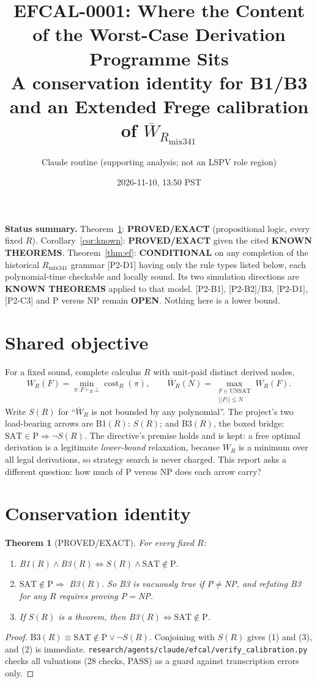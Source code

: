 \documentclass[11pt]{article}
\title{EFCAL-0001: Where the Content of the Worst-Case Derivation Programme Sits\\
\large A conservation identity for B1/B3 and an Extended Frege calibration of $\overline W_{R_{\mathrm{mix341}}}$}
\author{Claude routine (supporting analysis; not an LSPV role region)}
\date{2026-11-10, 13:50 PST}
\newtheorem{theorem}{Theorem}
\theoremstyle{remark}
\begin{document}
\maketitle

\noindent\textbf{Status summary.}
Theorem~\ref{thm:cons}: \textbf{PROVED/EXACT} (propositional logic, every fixed $R$).
Corollary~\ref{cor:known}: \textbf{PROVED/EXACT} given the cited \textbf{KNOWN THEOREMS}.
Theorem~\ref{thm:ef}: \textbf{CONDITIONAL} on any completion of the historical
$R_{\mathrm{mix341}}$ grammar [P2-D1] having only the rule types listed below,
each polynomial-time checkable and locally sound. Its two simulation directions are
\textbf{KNOWN THEOREMS} applied to that model.
[P2-B1], [P2-B2]/B3, [P2-D1], [P2-C3] and P versus NP remain \textbf{OPEN}.
Nothing here is a lower bound.

\section{Shared objective}
For a fixed sound, complete calculus $R$ with unit-paid distinct derived nodes,
\[
W_R(F)=\min_{\pi:F\vdash_R\bot}\operatorname{cost}_R(\pi),\qquad
\overline W_R(N)=\max_{\substack{F\in\mathrm{UNSAT}\\ |\langle F\rangle|\le N}} W_R(F).
\]
Write $S(R)$ for ``$\overline W_R$ is not bounded by any polynomial''. The project's two load-bearing arrows are
B1$(R)$: $S(R)$; and B3$(R)$, the boxed bridge: $\mathrm{SAT}\in\mathrm P\Rightarrow \neg S(R)$.
The directive's premise holds and is kept: a free optimal derivation is a legitimate
\emph{lower-bound} relaxation, because $W_R$ is a minimum over all legal derivations, so
strategy search is never charged. This report asks a different question: how much of P versus NP does each arrow carry?

\section{Conservation identity}
\begin{theorem}[PROVED/EXACT]\label{thm:cons}
For every fixed $R$:
\begin{enumerate}
\item B1$(R)\wedge$B3$(R)\iff S(R)\wedge \mathrm{SAT}\notin\mathrm P$.
\item $\mathrm{SAT}\notin\mathrm P\Rightarrow$ B3$(R)$. So B3 is vacuously true if P$\neq$NP, and refuting B3 for any $R$ requires proving P$=$NP.
\item If $S(R)$ is a theorem, then B3$(R)\iff\mathrm{SAT}\notin\mathrm P$.
\end{enumerate}
\end{theorem}
\begin{proof}
B3$(R)\equiv \mathrm{SAT}\notin\mathrm P\vee\neg S(R)$. Conjoining with $S(R)$ gives (1) and (3), and (2) is immediate.
\texttt{research/agents/claude/efcal/verify\_calibration.py} checks all valuations (28 checks, PASS) as a guard against transcription errors only.
\end{proof}
\end{document}
